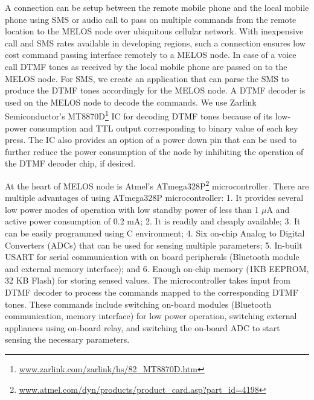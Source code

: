 \documentclass[10pt]{sigplan-proc-varsize}
\newcommand{\melos}{MELOS }
\begin{document}
A connection can be setup between the remote mobile phone and the local mobile phone using SMS or audio call to pass on multiple commands from the remote location to the \melos node over ubiquitous cellular network. With inexpensive call and SMS rates available in developing regions, such a connection ensures low cost command passing interface remotely to a \melos node. In case of a voice call DTMF tones as received by the local mobile phone are passed on to the \melos node. For SMS, we create an application that can parse the SMS to produce the DTMF tones accordingly for the \melos node. A DTMF decoder is used on the \melos node to decode the commands. We use Zarlink Semiconductor's MT8870D\footnote{\url{www.zarlink.com/zarlink/hs/82_MT8870D.htm}} IC for decoding DTMF tones because of its low-power consumption and TTL output corresponding to binary value of each key press. The IC also provides an option of a power down pin that can be used to further reduce the power consumption of the node by inhibiting the operation of the DTMF decoder chip, if desired.

At the heart of \melos node is Atmel's ATmega328P\footnote{\url{www.atmel.com/dyn/products/product_card.asp?part_id=4198}} microcontroller. There are multiple advantages of using ATmega328P microcontroller: 1. It provides several low power modes of operation with low standby power of less than 1 $\mu$A and active power consumption of 0.2 mA; 2. It is readily and cheaply available; 3. It can be easily programmed using C environment; 4. Six on-chip Analog to Digital Converters (ADCs) that can be used for sensing multiple parameters; 5. In-built USART for serial communication with on board peripherals (Bluetooth module and external memory interface); and 6. Enough on-chip memory (1KB EEPROM, 32 KB Flash) for storing sensed values. The microcontroller takes input from DTMF decoder to process the commands mapped to the corresponding DTMF tones. These commands include switching on-board modules (Bluetooth communication, memory interface) for low power operation, switching external appliances using on-board relay, and switching the on-board ADC to start sensing the necessary parameters. 
\end{document}
